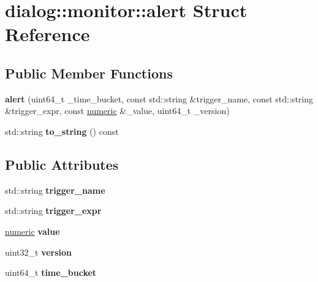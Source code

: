 \hypertarget{structdialog_1_1monitor_1_1alert}{}\section{dialog\+:\+:monitor\+:\+:alert Struct Reference}
\label{structdialog_1_1monitor_1_1alert}
\subsection*{Public Member Functions}
\begin{DoxyCompactItemize}
\item 
\mbox{\label{structdialog_1_1monitor_1_1alert_a0ae82c582ba7befbc7574ff69815d29a}} 
{\bfseries alert} (uint64\+\_\+t \+\_\+time\+\_\+bucket, const std\+::string \&trigger\+\_\+name, const std\+::string \&trigger\+\_\+expr, const \hyperlink{classdialog_1_1numeric}{numeric} \&\+\_\+value, uint64\+\_\+t \+\_\+version)
\item 
\mbox{\label{structdialog_1_1monitor_1_1alert_ad9e51dcb429cdebe3113b7ef8cb0abda}} 
std\+::string {\bfseries to\+\_\+string} () const
\end{DoxyCompactItemize}
\subsection*{Public Attributes}
\begin{DoxyCompactItemize}
\item 
\mbox{\label{structdialog_1_1monitor_1_1alert_a71b11ce6cd39b00c8b56dfd304580505}} 
std\+::string {\bfseries trigger\+\_\+name}
\item 
\mbox{\label{structdialog_1_1monitor_1_1alert_a0727ced14d1356e68fa654e47357f9a4}} 
std\+::string {\bfseries trigger\+\_\+expr}
\item 
\mbox{\label{structdialog_1_1monitor_1_1alert_a5d5c60a87968a5069a164512af98ada6}} 
\hyperlink{classdialog_1_1numeric}{numeric} {\bfseries value}
\item 
\mbox{\label{structdialog_1_1monitor_1_1alert_ae8595d8ba1806bf04a1dd37829fcab1e}} 
uint32\+\_\+t {\bfseries version}
\item 
\mbox{\label{structdialog_1_1monitor_1_1alert_a93257bcb6d63d74fdfb9f2c04633f5fc}} 
uint64\+\_\+t {\bfseries time\+\_\+bucket}
\end{DoxyCompactItemize}
